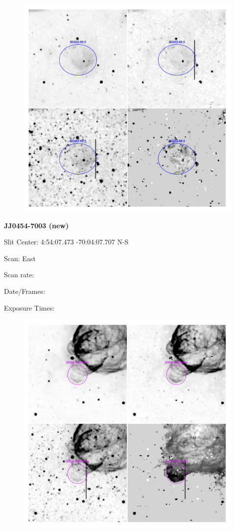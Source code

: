\documentclass[11pt]{article}
\begin{document}
\begin{figure}
\includegraphics[width=11.cm]{snapshots/B0453-685.png}
\end{figure}

\newpage
{\bf JJ0454-7003 (new)}

Slit Center:   4:54:07.473      -70:04:07.707     N-S

Scan:  East

Scan rate:  

Date/Frames:

Exposure Times:  

\begin{figure}
\includegraphics[width=11.cm]{snapshots/J0454-7003.png}
\end{figure}
\end{document}
